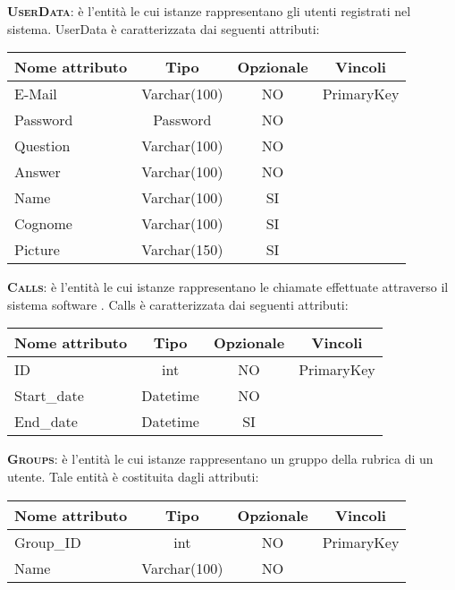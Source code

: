 \begin{description}
	\item{\scshape\bfseries UserData}: è l'entità le cui istanze rappresentano gli utenti registrati nel sistema. UserData è caratterizzata dai seguenti attributi:

\begin{center}
\begin{tabular}{lccc}
\toprule
Nome attributo & Tipo & Opzionale & Vincoli\\
\midrule %
E-Mail & Varchar(100) & NO & PrimaryKey\\
Password & Password & NO &\\
Question & Varchar(100) & NO &\\
Answer & Varchar(100) & NO &\\
Name & Varchar(100) & SI &\\
Cognome & Varchar(100) & SI &\\
Picture & Varchar(150) & SI &\\
\bottomrule
\end{tabular}
\end{center}

	\item{\scshape\bfseries Calls}: è l'entità le cui istanze rappresentano le chiamate effettuate attraverso il sistema software \caName. Calls è caratterizzata dai seguenti attributi:

\begin{center}
\begin{tabular}{lccc}
\toprule
Nome attributo & Tipo & Opzionale & Vincoli\\
\midrule %
ID & int & NO & PrimaryKey\\
Start\_date & Datetime & NO & \\
End\_date & Datetime & SI & \\
\bottomrule
\end{tabular}
\end{center}

	\item{\scshape\bfseries Groups}: è l'entità le cui istanze rappresentano un gruppo della rubrica di un utente. Tale entità è costituita dagli attributi:

\begin{center}
\begin{tabular}{lccc}
\toprule
Nome attributo & Tipo & Opzionale & Vincoli\\
\midrule %
Group\_ID & int & NO & PrimaryKey\\
Name & Varchar(100) & NO &\\
\bottomrule
\end{tabular}
\end{center}	
	

\end{description}

